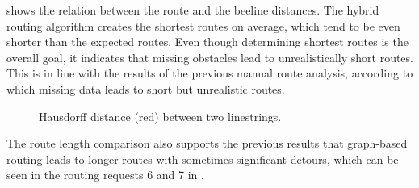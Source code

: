 			 shows the relation between the route and the beeline distances.
			The hybrid routing algorithm creates the shortest routes on average, which tend to be even shorter than the expected routes.
			Even though determining shortest routes is the overall goal, it indicates that missing obstacles lead to unrealistically short routes.
			This is in line with the results of the previous manual route analysis, according to which missing data leads to short but unrealistic routes.
			\begin{figure}
				\begin{figcenter}
				\end{figcenter}
				\caption[Illustration of the Hausdorff distance.]{Hausdorff distance (red) between two linestrings.}
				\label{fig:hausdorff-distance}
			\end{figure}
			The route length comparison also supports the previous results that graph-based routing leads to longer routes with sometimes significant detours, which can be seen in the routing requests 6 and 7 in .
